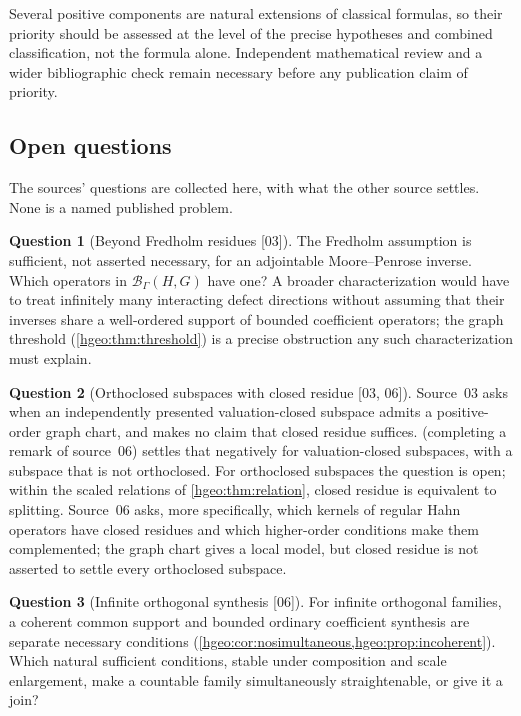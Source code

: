 \documentclass[11pt,letterpaper]{article}
\numberwithin{equation}{section}
\theoremstyle{definition}
\newtheorem{question}[question]{Question}
\theoremstyle{remark}
\newcommand{\BB}[2]{\mathscr B_\Gamma(#1,#2)}
\newcommand{\src}[1]{\textup{\textsf{\small[#1]}}}
\begin{document}
Several positive components are natural extensions of classical formulas, so
their priority should be assessed at the level of the precise hypotheses and
combined classification, not the formula alone. Independent mathematical
review and a wider bibliographic check remain necessary before any
publication claim of priority.

\subsection{Open questions}\label{hgeo:sub:questions}
The sources' questions are collected here, with what the other source
settles. None is a named published problem.

\begin{question}[Beyond Fredholm residues \src{03}]\label{hgeo:q:mp}
The Fredholm assumption is sufficient, not asserted necessary, for an
adjointable Moore--Penrose inverse. Which operators in $\BB{H}{G}$ have one?
A broader characterization would have to treat infinitely many interacting
defect directions without assuming that their inverses share a well-ordered
support of bounded coefficient operators; the graph threshold
(\cref{hgeo:thm:threshold}) is a precise obstruction any such
characterization must explain.
\end{question}

\begin{question}[Orthoclosed subspaces with closed residue \src{03, 06}]
\label{hgeo:q:orthoclosed}
Source~03 asks when an independently presented valuation-closed subspace
admits a positive-order graph chart, and makes no claim that closed residue
suffices.  (completing a remark of source~06)
settles that negatively for valuation-closed subspaces, with a subspace that
is not orthoclosed. For orthoclosed subspaces the question is open; within
the scaled relations of \cref{hgeo:thm:relation}, closed residue is
equivalent to splitting. Source~06 asks, more specifically, which kernels of
regular Hahn operators have closed residues and which higher-order conditions
make them complemented; the graph chart gives a local model, but closed
residue is not asserted to settle every orthoclosed subspace.
\end{question}

\begin{question}[Infinite orthogonal synthesis \src{06}]\label{hgeo:q:synthesis}
For infinite orthogonal families, a coherent common support and bounded
ordinary coefficient synthesis are separate necessary conditions
(\cref{hgeo:cor:nosimultaneous,hgeo:prop:incoherent}). Which natural
sufficient conditions, stable under composition and scale enlargement, make
a countable family simultaneously straightenable, or give it a join?
\end{question}
\end{document}
